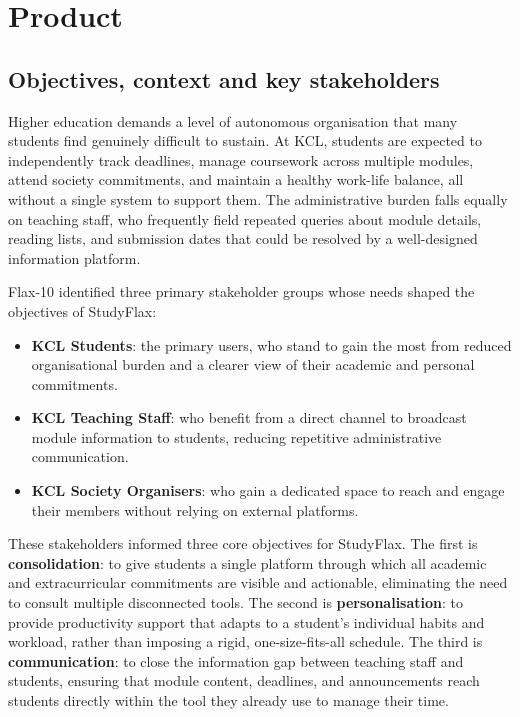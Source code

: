 \chapter{Product}
\label{sect:product}

\section{Objectives, context and key stakeholders}
\label{sect:objectives}

Higher education demands a level of autonomous organisation that many students find genuinely difficult to sustain. At KCL, students are expected to independently track deadlines, manage coursework across multiple modules, attend society commitments, and maintain a healthy work-life balance, all without a single system to support them. The administrative burden falls equally on teaching staff, who frequently field repeated queries about module details, reading lists, and submission dates that could be resolved by a well-designed information platform.

Flax-10 identified three primary stakeholder groups whose needs shaped the objectives of StudyFlax:

\begin{itemize}
    \item \textbf{KCL Students}: the primary users, who stand to gain the most from reduced organisational burden and a clearer view of their academic and personal commitments.
    \item \textbf{KCL Teaching Staff}: who benefit from a direct channel to broadcast module information to students, reducing repetitive administrative communication.
    \item \textbf{KCL Society Organisers}: who gain a dedicated space to reach and engage their members without relying on external platforms.
\end{itemize}

These stakeholders informed three core objectives for StudyFlax. The first is \textbf{consolidation}: to give students a single platform through which all academic and extracurricular commitments are visible and actionable, eliminating the need to consult multiple disconnected tools. The second is \textbf{personalisation}: to provide productivity support that adapts to a student's individual habits and workload, rather than imposing a rigid, one-size-fits-all schedule. The third is \textbf{communication}: to close the information gap between teaching staff and students, ensuring that module content, deadlines, and announcements reach students directly within the tool they already use to manage their time.

